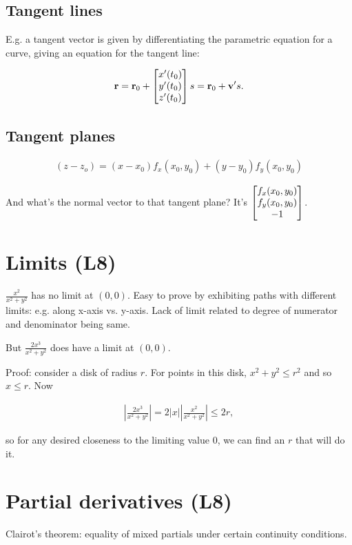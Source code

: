 \subsection*{Tangent lines}
E.g. a tangent vector is given by differentiating the parametric equation for a
curve, giving an equation for the tangent line:

\begin{align*}
  \mathbf r = \mathbf r_0 + \begin{bmatrix}x'(t_0)\\y'(t_0)\\z'(t_0)\end{bmatrix}s = \mathbf r_0 + \mathbf v' s.
\end{align*}

\subsection*{Tangent planes}

\begin{align*}
  (z - z_o) = (x - x_0)f_x(x_0, y_0) + (y - y_0)f_y(x_0, y_0)
\end{align*}

And what's the normal vector to that tangent plane? It's
$\begin{bmatrix}f_x(x_0, y_0)\\f_y(x_0, y_0)\\-1\end{bmatrix}$.


\section{Limits (L8)}

$\frac{x^2}{x^2 + y^2}$ has no limit at $(0, 0)$.
Easy to prove by exhibiting paths with different limits: e.g. along x-axis vs. y-axis.
Lack of limit related to degree of numerator and denominator being same.

But $\frac{2x^3}{x^2 + y^2}$ does have a limit at $(0, 0)$.

Proof: consider a disk of radius $r$. For points in this disk, $x^2 + y^2 \leq r^2$ and so $x \leq r$.
Now

\begin{align*}
  \left|\frac{2x^3}{x^2 + y^2}\right| = 2|x|\left|\frac{x^2}{x^2 + y^2}\right| \leq 2r,
\end{align*}

so for any desired closeness to the limiting value 0, we can find an $r$ that will do it.

\section{Partial derivatives (L8)}

Clairot's theorem: equality of mixed partials under certain continuity
conditions.


